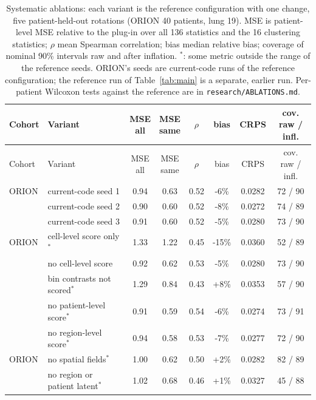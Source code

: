 \begin{longtable}{@{}p{.50in}p{2in}cccccc@{}}
\caption{Systematic ablations: each variant is the reference configuration with one change, five patient-held-out rotations (ORION 40 patients, lung 19). MSE is patient-level MSE relative to the plug-in over all 136 statistics and the 16 clustering statistics; $\rho$ mean Spearman correlation; bias median relative bias; coverage of nominal 90\% intervals raw and after inflation. $^*$: some metric outside the range of the reference seeds. ORION's seeds are current-code runs of the reference configuration; the reference run of Table~\ref{tab:main} is a separate, earlier run. Per-patient Wilcoxon tests against the reference are in \texttt{research/ABLATIONS.md}.}\label{tab:ablationfull}\\
\toprule
Cohort & Variant & \shortstack{MSE\\all} & \shortstack{MSE\\same} & $\rho$ & bias & CRPS & \shortstack{cov.\\raw / infl.} \\
\midrule
\endfirsthead
\toprule
Cohort & Variant & \shortstack{MSE\\all} & \shortstack{MSE\\same} & $\rho$ & bias & CRPS & \shortstack{cov.\\raw / infl.} \\
\midrule
\endhead
\bottomrule\endfoot
\bottomrule\endlastfoot
ORION & current-code seed 1 & 0.94 & 0.63 & 0.52 & -6\% & 0.0282 & 72 / 90 \\
 & current-code seed 2 & 0.90 & 0.60 & 0.52 & -8\% & 0.0272 & 74 / 89 \\
 & current-code seed 3 & 0.91 & 0.60 & 0.52 & -5\% & 0.0280 & 73 / 90 \\
\addlinespace
ORION & cell-level score only$^*$ & 1.33 & 1.22 & 0.45 & -15\% & 0.0360 & 52 / 89 \\
 & no cell-level score & 0.92 & 0.62 & 0.53 & -5\% & 0.0280 & 73 / 90 \\
 & bin contrasts not scored$^*$ & 1.29 & 0.84 & 0.43 & +8\% & 0.0353 & 57 / 90 \\
 & no patient-level score$^*$ & 0.91 & 0.59 & 0.54 & -6\% & 0.0274 & 73 / 91 \\
 & no region-level score$^*$ & 0.94 & 0.58 & 0.53 & -7\% & 0.0277 & 72 / 90 \\
\addlinespace
ORION & no spatial fields$^*$ & 1.00 & 0.62 & 0.50 & +2\% & 0.0282 & 82 / 89 \\
 & no region or patient latent$^*$ & 1.02 & 0.68 & 0.46 & +1\% & 0.0327 & 45 / 88 \\

\end{longtable}
